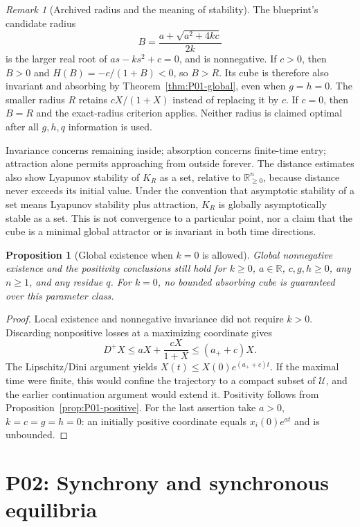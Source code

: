 \documentclass[11pt]{article}
\newcommand{\R}{\mathbb{R}}
\newcommand{\Orth}{\R_{\geq 0}^{n}}
\newcommand{\Domain}{\mathcal{U}}
\newtheorem{proposition}[theorem]{Proposition}
\theoremstyle{definition}
\theoremstyle{remark}
\newtheorem{remark}[theorem]{Remark}
\begin{document}
\begin{remark}[Archived radius and the meaning of stability]
The blueprint's candidate radius
\[
 B=\frac{a+\sqrt{a^2+4kc}}{2k}
\]
is the larger real root of $as-ks^2+c=0$, and is nonnegative. If $c>0$, then $B>0$ and
$H(B)=-c/(1+B)<0$, so $B>R$. Its cube is therefore also invariant
and absorbing by Theorem~\ref{thm:P01-global}, even when $g=h=0$.
The smaller radius $R$ retains $cX/(1+X)$ instead of replacing it
by $c$. If $c=0$, then $B=R$ and the exact-radius criterion applies.
Neither radius is claimed optimal after all $g,h,q$ information is used.

Invariance concerns remaining inside; absorption concerns finite-time
entry; attraction alone permits approaching from outside forever.
The distance estimates also show Lyapunov stability of $K_R$ as a set,
relative to $\Orth$, because distance never exceeds its initial value.
Under the convention that asymptotic stability of a set means Lyapunov
stability plus attraction, $K_R$ is globally asymptotically stable as
a set. This is not convergence to a particular point, nor a claim that
the cube is a minimal global attractor or is invariant in both time
directions.
\end{remark}

\begin{proposition}[Global existence when $k=0$ is allowed]
\label{prop:P01-kzero}
Global nonnegative existence and the positivity conclusions still hold
for $k\ge0$, $a\in\R$, $c,g,h\ge0$, any $n\ge1$, and any residue $q$.
For $k=0$, no bounded absorbing cube is guaranteed over this parameter
class.
\end{proposition}
\begin{proof}
Local existence and nonnegative invariance did not require $k>0$.
Discarding nonpositive losses at a maximizing coordinate gives
\[
 D^+X\le aX+\frac{cX}{1+X}\le(a_++c)X.
\]
The Lipschitz/Dini argument yields $X(t)\le X(0)e^{(a_++c)t}$.
If the maximal time were finite, this would confine the trajectory
to a compact subset of $\Domain$, and the earlier continuation
argument would extend it. Positivity follows from
Proposition~\ref{prop:P01-positive}. For the last assertion take
$a>0$, $k=c=g=h=0$: an initially positive coordinate equals
$x_i(0)e^{at}$ and is unbounded.
\end{proof}


\section{P02: Synchrony and synchronous equilibria}
\label{sec:P02}
\end{document}
